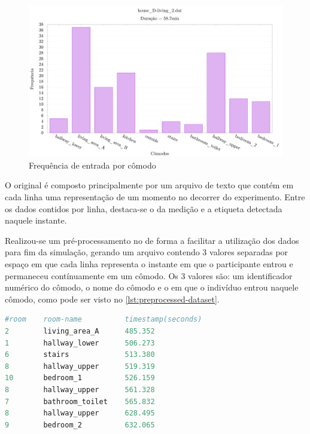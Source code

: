 \begin{figure}[htb]
	
	\begin{center}
		
		\caption{\label{fig:dataset-histogram}Frequência de entrada por cômodo}
		\includegraphics[width=0.95\linewidth]{img/dataset-histogram}
		\fonte{\autoriapropria}
		
	\end{center}

\end{figure}

O \dataset original é composto principalmente por um arquivo de texto que contém em cada linha uma representação de um momento no decorrer do experimento. Entre os dados contidos por linha, destaca-se o \timestamp da medição e a etiqueta detectada naquele instante. 

Realizou-se um pré-processamento no \dataset de forma a facilitar a utilização dos dados para fim da simulação, gerando um arquivo contendo 3 valores separadas por espaço em que cada linha representa o instante em que o participante entrou e permaneceu contínuamente em um cômodo. Os 3 valores são: um identificador numérico do cômodo, o nome do cômodo e o \timestamp em que o indivíduo entrou naquele cômodo, como pode ser visto no \autoref{lst:preprocessed-dataset}.
\begin{lstlisting}[language=python, caption={Parte do \dataset pré-processado}, label=lst:preprocessed-dataset]
#room    room-name          timestamp(seconds)
2        living_area_A      485.352
1        hallway_lower      506.273
6        stairs             513.380
8        hallway_upper      519.319
10       bedroom_1          526.159
8        hallway_upper      561.328
7        bathroom_toilet    565.832
8        hallway_upper      628.495
9        bedroom_2          632.065
\end{lstlisting}
	

